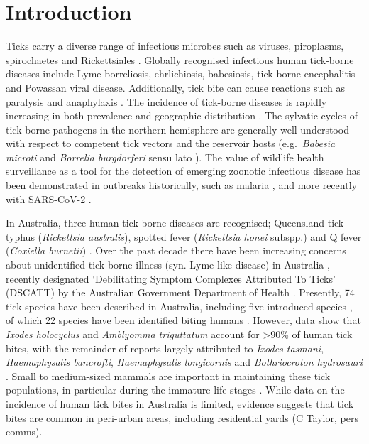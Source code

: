 \documentclass[a4paper, nobind]{templates/ociamthesis}
\begin{document}
\hypertarget{introduction-1}{%
\section{Introduction}\label{introduction-1}}

Ticks carry a diverse range of infectious microbes such as viruses, piroplasms, spirochaetes and Rickettsiales \autocite{pfaffleEcologyTickborneDiseases2013}.
Globally recognised infectious human tick-borne diseases include Lyme borreliosis, ehrlichiosis, babesiosis, tick-borne encephalitis and Powassan viral disease.
Additionally, tick bite can cause reactions such as paralysis and anaphylaxis \autocite{vannunenAssociationTickBite2009}.
The incidence of tick-borne diseases is rapidly increasing in both prevalence and geographic distribution \autocite{madison-antenucciEmergingTickBorneDiseases2020}.
The sylvatic cycles of tick-borne pathogens in the northern hemisphere are generally well understood with respect to competent tick vectors and the reservoir hosts (e.g.~\emph{Babesia microti} \autocite{westbladeBabesiaMicrotiMice2017} and \emph{Borrelia burgdorferi} sensu lato \autocite{radolfTicksMiceMen2012}).
The value of wildlife health surveillance as a tool for the detection of emerging zoonotic infectious disease has been demonstrated in outbreaks historically, such as malaria \autocite{rondonPrevalencePlasmodiumParasites2019}, and more recently with SARS-CoV-2 \autocite{plowrightLandUseinducedSpillover2021}.

In Australia, three human tick-borne diseases are recognised; Queensland tick typhus (\emph{Rickettsia australis}), spotted fever (\emph{Rickettsia honei} subspp.) and Q fever (\emph{Coxiella burnetii}) \autocite{gravesTickborneInfectiousDiseases2017}.
Over the past decade there have been increasing concerns about unidentified tick-borne illness (syn. Lyme-like disease) in Australia \autocite{chaladaThereLymelikeDisease2016}, recently designated `Debilitating Symptom Complexes Attributed To Ticks' (DSCATT) by the Australian Government Department of Health \autocite{radcliffeGrowingEvidenceEmerging2016}.
Presently, 74 tick species have been described in Australia, including five introduced species \autocite{barkerIxodesBarkeriSp2019,evansAutomaticBarcodeGap2019}, of which 22 species have been identified biting humans \autocite{kwakFirstRecordsHuman2018}.
However, data show that \emph{Ixodes holocyclus} and \emph{Amblyomma triguttatum} account for \textgreater90\% of human tick bites, with the remainder of reports largely attributed to \emph{Ixodes tasmani}, \emph{Haemaphysalis bancrofti}, \emph{Haemaphysalis longicornis} and \emph{Bothriocroton hydrosauri} \autocite{kwakFirstRecordsHuman2018}.
Small to medium-sized mammals are important in maintaining these tick populations, in particular during the immature life stages \autocite{murdochEcologyCommonMarsupial2005,lydeckerPeriurbanBlackRats2019,taylorInvasiveRabbitsHost2020}.
While data on the incidence of human tick bites in Australia is limited, evidence suggests that tick bites are common in peri-urban areas, including residential yards (C Taylor, pers comms).
\end{document}
